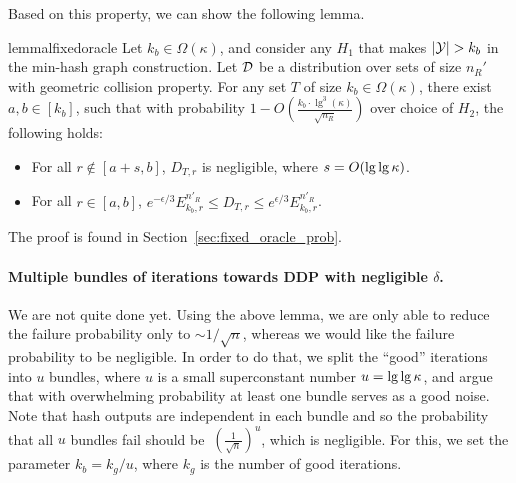 Based on this property, we can show the following lemma. 
%
\begin{restatable}{lemma}{lfixedoracle} \label{cor:fixed_oracle_prob}
Let $k_b \in \Omega(\kappa)$, and consider any $H_1$ that makes $|\mathcal{Y}| >
k_b$ in the min-hash graph construction. 
Let ${\cal D}$ be a distribution over sets of size $n_R'$ with geometric
collision property. 
For any set $T$ of size $k_b \in \Omega(\kappa)$, there exist $a, b \in [k_b]$, such that with probability
$1-O(\frac{k_b \cdot \lg^3(\kappa)}{\sqrt{n_R}})$ over choice of $H_2$, the following holds:
\begin{itemize}
    \item For all $r \not \in [a+s, b]$, $D_{T,r}$ is negligible, where $s = O(\lg\lg \kappa)$.
    \item For all $r \in [a, b]$, $e^{-\epsilon/3} E^{n'_R}_{k_b,r} \leq D_{T,r} \leq e^{\epsilon/3} E^{n'_R}_{k_b,r}$.
\end{itemize}
\end{restatable}

The proof is found in Section~\ref{sec:fixed_oracle_prob}. 

\paragraph{Multiple bundles of iterations towards DDP with negligible $\delta$.}
We are not quite done yet. Using the above lemma, we are only able to
reduce the failure probability only to $\sim 1/\sqrt{n}$, whereas we
would like the failure probability to be negligible.  In order to do
that, we split the ``good'' iterations into $u$ bundles, where $u$ is a
small superconstant number $u = \lg\lg \kappa$, and argue that
with overwhelming probability at least one bundle serves as a good noise. Note
that hash outputs are independent in each bundle and so the probability
that all $u$ bundles fail should be $~(\frac{1}{\sqrt{n}})^u$, which is
negligible. For this, we set the parameter $k_b = k_g/u$, where $k_g$ is the
number of good iterations. 



